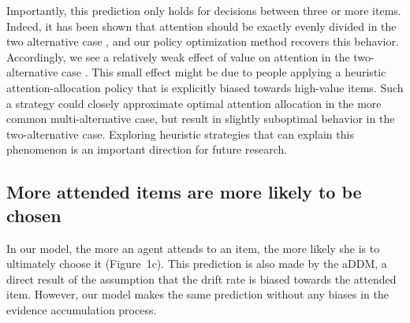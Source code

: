 \documentclass[11pt]{article} %
\begin{document}
Importantly, this prediction only holds for decisions between three or more items. Indeed, it has been shown that attention should be exactly evenly divided in the two alternative case \citep{Fudenberg2018}, and our policy optimization method recovers this behavior. Accordingly, we see a relatively weak effect of value on attention in the two-alternative case \citep{Krajbich2010}. This small effect might be due to people applying a heuristic attention-allocation policy that is explicitly biased towards high-value items. Such a strategy could closely approximate optimal attention allocation in the more common multi-alternative case, but result in slightly suboptimal behavior in the two-alternative case. Exploring heuristic strategies that can explain this phenomenon is an important direction for future research.


\subsection{More attended items are more likely to be chosen}







In our model, the more an agent attends to an item, the more likely she is to ultimately choose it (Figure~1c).
This prediction is also made by the aDDM, a direct result of the assumption that the drift rate is biased towards the attended item. However, our model makes the same prediction without any biases in the evidence accumulation process.
\end{document}
